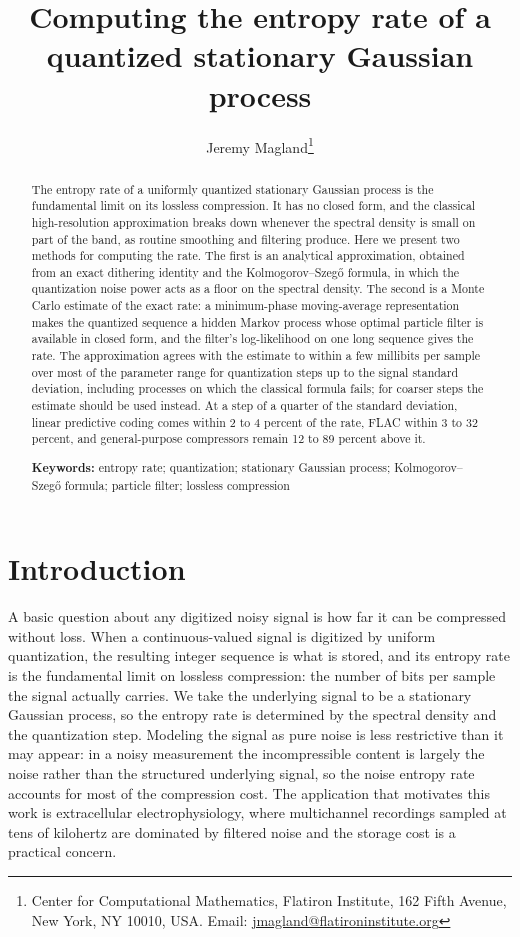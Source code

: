 \documentclass[11pt]{article}
\title{Computing the entropy rate of a\\ quantized stationary Gaussian process}
\author{Jeremy Magland\thanks{Center for Computational Mathematics, Flatiron Institute, 162 Fifth Avenue, New York, NY 10010, USA. Email: \href{mailto:jmagland@flatironinstitute.org}{jmagland@flatironinstitute.org}}}
\date{}
\begin{document}
\maketitle

\begin{abstract}
The entropy rate of a uniformly quantized stationary Gaussian process is the fundamental limit on its lossless compression. It has no closed form, and the classical high-resolution approximation breaks down whenever the spectral density is small on part of the band, as routine smoothing and filtering produce. Here we present two methods for computing the rate. The first is an analytical approximation, obtained from an exact dithering identity and the Kolmogorov--Szegő formula, in which the quantization noise power acts as a floor on the spectral density. The second is a Monte Carlo estimate of the exact rate: a minimum-phase moving-average representation makes the quantized sequence a hidden Markov process whose optimal particle filter is available in closed form, and the filter's log-likelihood on one long sequence gives the rate. The approximation agrees with the estimate to within a few millibits per sample over most of the parameter range for quantization steps up to the signal standard deviation, including processes on which the classical formula fails; for coarser steps the estimate should be used instead. At a step of a quarter of the standard deviation, linear predictive coding comes within 2 to 4 percent of the rate, FLAC within 3 to 32 percent, and general-purpose compressors remain 12 to 89 percent above it.

\medskip
\noindent\textbf{Keywords:} entropy rate; quantization; stationary Gaussian process; Kolmogorov--Szegő formula; particle filter; lossless compression
\end{abstract}

\section{Introduction}\label{introduction}

A basic question about any digitized noisy signal is how far it can be compressed without loss. When a continuous-valued signal is digitized by uniform quantization, the resulting integer sequence is what is stored, and its entropy rate is the fundamental limit on lossless compression: the number of bits per sample the signal actually carries. We take the underlying signal to be a stationary Gaussian process, so the entropy rate is determined by the spectral density and the quantization step. Modeling the signal as pure noise is less restrictive than it may appear: in a noisy measurement the incompressible content is largely the noise rather than the structured underlying signal, so the noise entropy rate accounts for most of the compression cost. The application that motivates this work is extracellular electrophysiology, where multichannel recordings sampled at tens of kilohertz are dominated by filtered noise and the storage cost is a practical concern.
\end{document}
